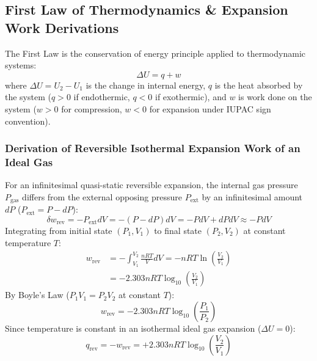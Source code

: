 \documentclass[10pt,twoside,openright]{book}
\begin{document}
\subsection{First Law of Thermodynamics \& Expansion Work Derivations}
The First Law is the conservation of energy principle applied to thermodynamic systems:
\begin{equation}
  \Delta U = q + w
\end{equation}
where $\Delta U = U_2 - U_1$ is the change in internal energy, $q$ is the heat absorbed by the system ($q > 0$ if endothermic, $q < 0$ if exothermic), and $w$ is work done on the system ($w > 0$ for compression, $w < 0$ for expansion under IUPAC sign convention).

\subsubsection{Derivation of Reversible Isothermal Expansion Work of an Ideal Gas}
For an infinitesimal quasi-static reversible expansion, the internal gas pressure $P_{\text{gas}}$ differs from the external opposing pressure $P_{\text{ext}}$ by an infinitesimal amount $dP$ ($P_{\text{ext}} = P - dP$):
\begin{equation}
  \delta w_{\text{rev}} = -P_{\text{ext}} dV = -(P - dP) dV = -P dV + dP dV \approx -P dV
\end{equation}
Integrating from initial state $(P_1, V_1)$ to final state $(P_2, V_2)$ at constant temperature $T$:
\begin{align}
  w_{\text{rev}} &= -\int_{V_1}^{V_2} \frac{n R T}{V} dV = -n R T \ln\left(\frac{V_2}{V_1}\right) \\
                 &= -2.303 n R T \log_{10}\left(\frac{V_2}{V_1}\right)
\end{align}
By Boyle's Law ($P_1 V_1 = P_2 V_2$ at constant $T$):
\begin{equation}
  w_{\text{rev}} = -2.303 n R T \log_{10}\left(\frac{P_1}{P_2}\right)
\end{equation}
Since temperature is constant in an isothermal ideal gas expansion ($\Delta U = 0$):
\begin{equation}
  q_{\text{rev}} = -w_{\text{rev}} = +2.303 n R T \log_{10}\left(\frac{V_2}{V_1}\right)
\end{equation}
\end{document}

